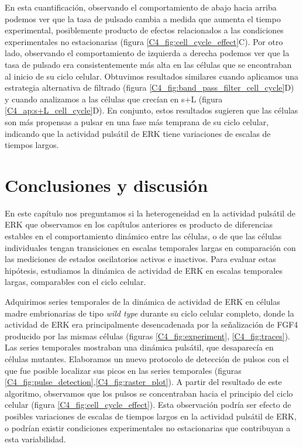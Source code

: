 \documentclass[./main.tex]{subfiles}
\begin{document}
En esta cuantificación, observando el comportamiento de abajo hacia arriba podemos ver que la tasa de pulsado cambia a medida que aumenta el tiempo experimental, posiblemente producto de efectos relacionados a las condiciones experimentales no estacionarias (figura \ref{C4_fig:cell_cycle_effect}C). Por otro lado, observando el comportamiento de izquierda a derecha podemos ver que la tasa de pulsado era consistentemente más alta en las células que se encontraban al inicio de su ciclo celular. Obtuvimos resultados similares cuando aplicamos una estrategia alternativa de filtrado (figura \ref{C4_fig:band_pass_filter_cell_cycle}D) y cuando analizamos a las células que crecían en s+L (figura \ref{C4_ap:s+L_cell_cycle}D). En conjunto, estos resultados sugieren que las células son más propensas a pulsar en una fase más temprana de su ciclo celular, indicando que la actividad pulsátil de ERK tiene variaciones de escalas de tiempos largos.




\section{Conclusiones y discusión}



En este capítulo nos preguntamos si la heterogeneidad en la actividad pulsátil de ERK que observamos en los capítulos anteriores es producto de diferencias estables en el comportamiento dinámico entre las células, o de que las células individuales tengan transiciones en escalas temporales largas en comparación con las mediciones de estados oscilatorios activos e inactivos. Para evaluar estas hipótesis, estudiamos la dinámica de actividad de ERK en escalas temporales largas, comparables con el ciclo celular. 

Adquirimos series temporales de la dinámica de actividad de ERK en células madre embrionarias de tipo \textit{wild type} durante su ciclo celular completo, donde la actividad de ERK era principalmente desencadenada por la señalización de FGF4 producido por las mismas células (figuras \ref{C4_fig:experiment}, \ref{C4_fig:traces}). Las series temporales mostraban una dinámica pulsátil, que desaparecía en células mutantes. Elaboramos un nuevo protocolo de detección de pulsos con el que fue posible localizar sus picos en las series temporales (figuras \ref{C4_fig:pulse_detection},\ref{C4_fig:raster_plot}). 
A partir del resultado de este algoritmo, observamos que los pulsos se concentraban hacia el principio del ciclo celular (figura \ref{C4_fig:cell_cycle_effect}). Esta observación podría ser efecto de posibles variaciones de escalas de tiempos largos en la actividad pulsátil de ERK, o podrían existir condiciones experimentales no estacionarias que contribuyan a esta variabilidad.
\end{document}
